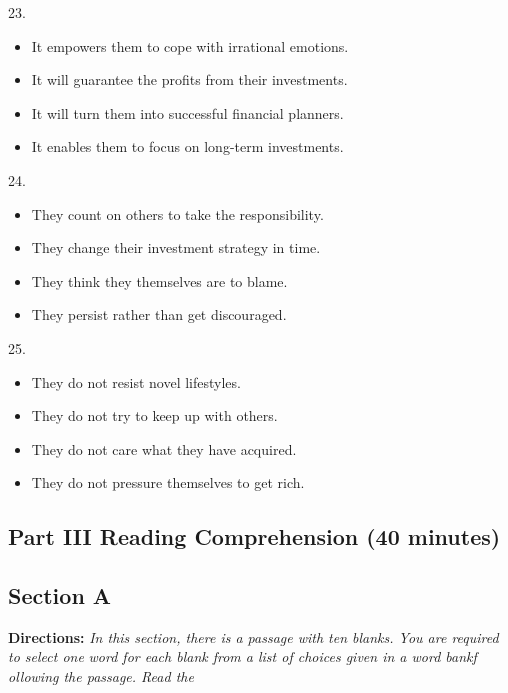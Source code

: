 \documentclass[UTF8,11pt]{ctexart}
\begin{document}
23.


\begin{itemize}[leftmargin=2em,itemsep=.2em,topsep=.4em]\item[A.] It empowers them to cope with irrational emotions.
\item[B.] It will guarantee the profits from their investments.
\item[C.] It will turn them into successful financial planners.
\item[D.] It enables them to focus on long-term investments.
\end{itemize}

24.


\begin{itemize}[leftmargin=2em,itemsep=.2em,topsep=.4em]\item[A.] They count on others to take the responsibility.
\item[B.] They change their investment strategy in time.
\item[C.] They think they themselves are to blame.
\item[D.] They persist rather than get discouraged.
\end{itemize}

25.


\begin{itemize}[leftmargin=2em,itemsep=.2em,topsep=.4em]\item[A.] They do not resist novel lifestyles.
\item[B.] They do not try to keep up with others.
\item[C.] They do not care what they have acquired.
\item[D.] They do not pressure themselves to get rich.
\end{itemize}

\subsection*{\textbf{Part III} \textbf{Reading Comprehension} \textbf{(40 minutes)}}


\subsection*{\textbf{Section A}}


\textbf{Directions: }\textit{In this section, there is a passage with ten blanks. You are required to select one} \textit{word for each blank from a list of choices given in a word bankf ollowing the passage. Read the}
\end{document}
